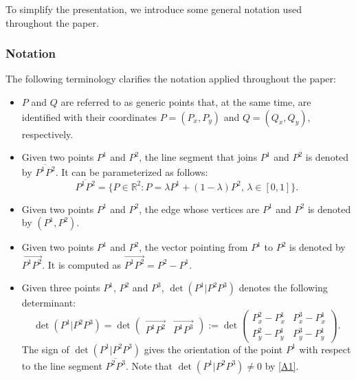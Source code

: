 \documentclass[a4paper,  review, authoryear, 1p., doubleblind]{elsarticle}
\newcommand{\SPPN}{{\sf{H-SPPN}\xspace }}
\newcommand{\segment}[2]{\overline{#1#2}}
\newcommand{\determinant}[3]{\det({#1|#2#3})}
\begin{document}
	
	To simplify the presentation, we introduce some general notation used throughout the paper.
	\subsubsection*{Notation} 
	
	The following terminology clarifies the notation applied throughout the paper: 
	\begin{itemize}
		\item $P$ and $Q$ are referred to as generic points that, at the same time, are identified with their coordinates $P=(P_x, P_y)$ and $Q=(Q_x, Q_y)$, respectively.
		\item Given two points $P^1$ and $P^2$, the line segment that joins $P^1$ and $P^2$ is denoted by $\segment{P^1}{P^2}$. It can be parameterized as follows:
		$$\segment{P^1}{P^2}=\{P\in\mathbb R^2:P=\lambda P^1 + (1-\lambda)P^2,\,\lambda\in[0,1]\}.$$
		\item  Given two points $P^1$ and $P^2$, the edge whose vertices are $P^1$ and $P^2$ is denoted by $(P^1, P^2)$.
		\item  Given two points $P^1$ and $P^2$, the vector pointing from $P^1$ to $P^2$ is denoted by $\overrightarrow{P^1P^2}$. It is computed as
		$\overrightarrow{P^1P^2}=P^2-P^1.$
		\item Given three points $P^1$, $P^2$ and $P^3$, $\determinant{P^1}{P^2}{P^3}$ denotes the following determinant:
		$$
		\determinant{P^1}{P^2}{P^3}=\det\left(\begin{array}{c|c} \overrightarrow{P^1P^2} & \overrightarrow{P^1P^3}\end{array}\right):=\det\left( \begin{array}{cc}  P^2_x-P^1_x & P^3_x-P^1_x \\ P_y^2-P^1_y & P_y^3-P_y^1 \end{array}\right).
		$$
		The sign of $\determinant{P^1}{P^2}{P^3}$ gives the orientation of the point $P^1$ with respect to the line segment $\segment{P^2}{P^3}.$ Note that $\determinant{P^1}{P^2}{P^3}\neq 0$ by \ref{A1}. 
	\end{itemize}
	
\end{document}
